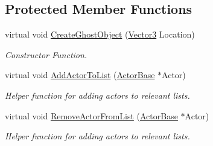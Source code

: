 \subsection*{Protected Member Functions}
\begin{DoxyCompactItemize}
\item 
virtual void \hyperlink{classphys_1_1AreaEffect_a31e4c0fee03dca66ba4c49727b20f58d}{CreateGhostObject} (\hyperlink{classphys_1_1Vector3}{Vector3} Location)
\begin{DoxyCompactList}\small\item\em Constructor Function. \item\end{DoxyCompactList}\item 
\hypertarget{classphys_1_1AreaEffect_a7af039b84f8d55e2c1c2d5a1b57afd8a}{
virtual void \hyperlink{classphys_1_1AreaEffect_a7af039b84f8d55e2c1c2d5a1b57afd8a}{AddActorToList} (\hyperlink{classphys_1_1ActorBase}{ActorBase} $\ast$Actor)}
\label{d4/d55/classphys_1_1AreaEffect_a7af039b84f8d55e2c1c2d5a1b57afd8a}

\begin{DoxyCompactList}\small\item\em Helper function for adding actors to relevant lists. \item\end{DoxyCompactList}\item 
\hypertarget{classphys_1_1AreaEffect_a98bf156da3c7f8bb98d5ce9d37b6aa0f}{
virtual void \hyperlink{classphys_1_1AreaEffect_a98bf156da3c7f8bb98d5ce9d37b6aa0f}{RemoveActorFromList} (\hyperlink{classphys_1_1ActorBase}{ActorBase} $\ast$Actor)}
\label{d4/d55/classphys_1_1AreaEffect_a98bf156da3c7f8bb98d5ce9d37b6aa0f}

\begin{DoxyCompactList}\small\item\em Helper function for adding actors to relevant lists. \item\end{DoxyCompactList}\end{DoxyCompactItemize}

